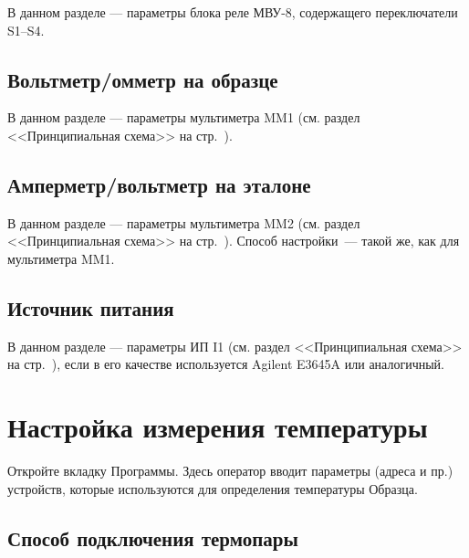 \documentclass[12pt, a4paper, twocolumn]{report}
\begin{document}
В данном разделе --- параметры блока реле МВУ-8, содержащего переключатели S1--S4.



\subsection{Вольтметр/омметр на образце}
\label{sec_mm1_config}

В данном разделе --- параметры мультиметра MM1 (см. раздел <<Принципиальная схема>> на стр.~\pageref{sec_schematic_diagram}).



\subsection{Амперметр/вольтметр на эталоне}

В данном разделе --- параметры мультиметра MM2 (см. раздел <<Принципиальная схема>> на стр.~\pageref{sec_schematic_diagram}). Способ настройки~--- такой же, как для мультиметра MM1.


\subsection{Источник питания}

В данном разделе --- параметры ИП I1 (см. раздел <<Принципиальная схема>> на стр.~\pageref{sec_schematic_diagram}), если в его качестве используется Agilent E3645A или аналогичный.




\section{Настройка измерения температуры}

Откройте вкладку  Программы. Здесь оператор вводит параметры (адреса и пр.) устройств, которые используются для определения температуры Образца.

\subsection{Способ подключения термопары}
\end{document}
